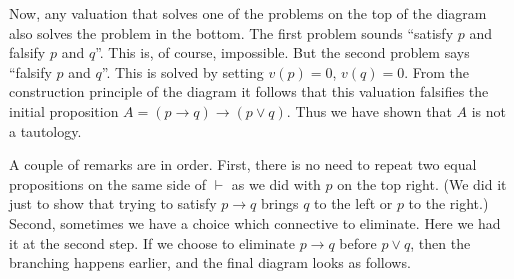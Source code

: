 Now, any valuation that solves one of the problems on the top of the diagram also solves the problem in the bottom.
The first problem sounds ``satisfy $p$ and falsify $p$ and $q$''.
This is, of course, impossible.
But the second problem says ``falsify $p$ and $q$''.
This is solved by setting $v(p) = 0$, $v(q) = 0$.
From the construction principle of the diagram it follows that this valuation falsifies the initial proposition $A = (p \to q) \to (p \vee q)$.
Thus we have shown that $A$ is not a tautology.

A couple of remarks are in order.
First, there is no need to repeat two equal propositions on the same side of $\vdash$ as we did with $p$ on the top right.
(We did it just to show that trying to satisfy $p \to q$ brings $q$ to the left or $p$ to the right.)
Second, sometimes we have a choice which connective to eliminate.
Here we had it at the second step.
If we choose to eliminate $p \to q$ before $p \vee q$, then the branching happens earlier, and the final diagram looks as follows.
\begin{prooftree}
\end{prooftree}




